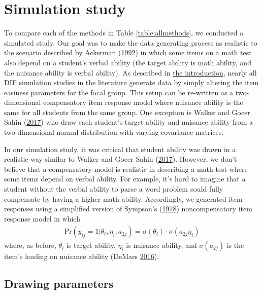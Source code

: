 \documentclass[
  11pt,
]{article}
\begin{document}
\hypertarget{simstudy}{%
\section{Simulation study}\label{simstudy}}

To compare each of the methods in Table \ref{table:allmethods}, we conducted a simulated study. Our goal was to make the data generating process as realistic to the scenario described by Ackerman (\protect\hyperlink{ref-ackerman1992didactic}{1992}) in which some items on a math test also depend on a student's verbal ability (the target ability is math ability, and the nuisance ability is verbal ability). As described in \protect\hyperlink{intro}{the introduction}, nearly all DIF simulation studies in the literature generate data by simply altering the item easiness parameters for the focal group. This setup can be re-written as a two-dimensional compensatory item response model where nuisance ability is the same for all students from the same group. One exception is Walker and Gocer Sahin (\protect\hyperlink{ref-walker2017using}{2017}) who draw each student's target ability and nuisance ability from a two-dimensional normal distribution with varying covariance matrices.

In our simulation study, it was critical that student ability was drawn in a realistic way similar to Walker and Gocer Sahin (\protect\hyperlink{ref-walker2017using}{2017}). However, we don't believe that a compensatory model is realistic in describing a math test where some items depend on verbal ability. For example, it's hard to imagine that a student without the verbal ability to parse a word problem could fully compensate by having a higher math ability. Accordingly, we generated item responses using a simplified version of Sympson's (\protect\hyperlink{ref-sympson1978model}{1978}) noncompensatory item response model in which
\begin{align}
\text{Pr}(y_{ij} = 1 | \theta_i, \eta_i, a_{2j}) = \sigma(\theta_i) \cdot \sigma(a_{2j}\eta_i)
\end{align}
where, as before, \(\theta_i\) is target ability, \(\eta_i\) is nuisance ability, and \(\sigma(a_{2j})\) is the item's loading on nuisance ability (DeMars \protect\hyperlink{ref-demars2016partially}{2016}).

\hypertarget{drawing-parameters}{%
\subsection{Drawing parameters}\label{drawing-parameters}}
\end{document}
